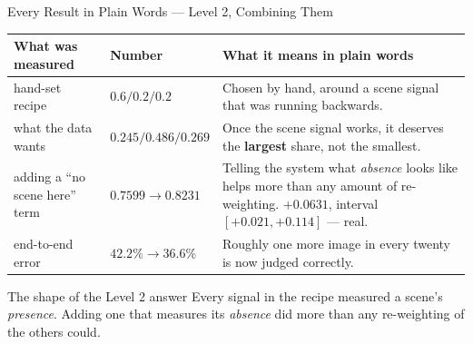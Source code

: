 \documentclass[aspectratio=169,11pt]{beamer}
\begin{document}
\begin{frame}{Every Result in Plain Words --- Level 2, Combining Them}
\scriptsize
\begin{center}
\begin{tabular}{@{}p{2.9cm} l p{7.0cm}@{}}
\toprule
\textbf{What was measured} & \textbf{Number} & \textbf{What it means in plain words} \\
\midrule
hand-set recipe & $0.6/0.2/0.2$ & Chosen by hand, around a scene signal that was running backwards. \\
\addlinespace
what the data wants & $0.245/0.486/0.269$ & Once the scene signal works, it deserves the \textbf{largest} share, not the smallest. \\
\addlinespace
adding a ``no scene here'' term & $0.7599 \to \mathbf{0.8231}$ & Telling the system what \emph{absence} looks like helps more than any amount of re-weighting. $+0.0631$, interval $[+0.021, +0.114]$ --- real. \\
\addlinespace
end-to-end error & $42.2\% \to \mathbf{36.6\%}$ & Roughly one more image in every twenty is now judged correctly. \\
\bottomrule
\end{tabular}
\end{center}
\vspace{1mm}
\begin{exampleblock}{\small The shape of the Level 2 answer}
\footnotesize Every signal in the recipe measured a scene's \emph{presence}. Adding one that measures its \emph{absence} did more than any re-weighting of the others could.
\end{exampleblock}
\end{frame}
\end{document}

